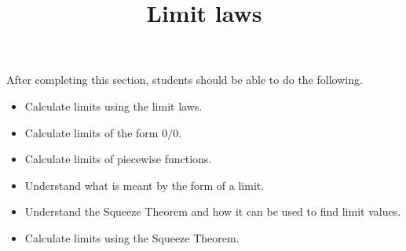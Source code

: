 \documentclass{ximera}
\title{Limit laws}
\begin{document}
\begin{abstract}
\end{abstract}

\maketitle

After completing this section, students should be able to do the following.

\begin{itemize}
	\item Calculate limits using the limit laws.
	\item Calculate limits of the form $0/0$.
	\item Calculate limits of piecewise functions.
	\item Understand what is meant by the form of a limit.
	\item Understand the Squeeze Theorem and how it can be used to find limit values.
	\item Calculate limits using the Squeeze Theorem.
\end{itemize}
\end{document}
